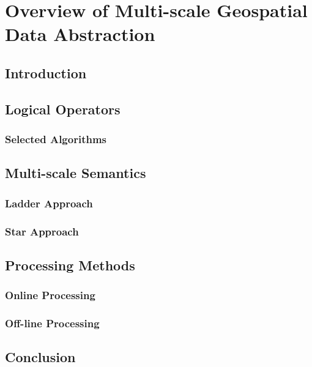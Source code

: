 \chapter{Overview of Multi-scale Geospatial Data Abstraction}

\section{Introduction}

\section{Logical Operators}
\subsection{Selected Algorithms}

\section{Multi-scale Semantics}
\subsection{Ladder Approach}
\subsection{Star Approach}

\section{Processing Methods}
\subsection{Online Processing}

\subsection{Off-line Processing}

\section{Conclusion}

